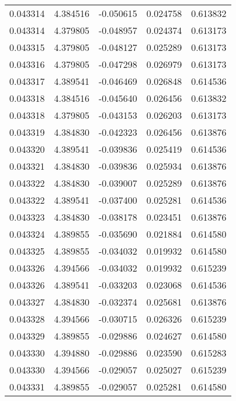\begin{tabular}{lrrrr}
0.043314    &  4.384516 & -0.050615 &  0.024758 &             0.613832 \\
0.043314    &  4.379805 & -0.048957 &  0.024374 &             0.613173 \\
0.043315    &  4.379805 & -0.048127 &  0.025289 &             0.613173 \\
0.043316    &  4.379805 & -0.047298 &  0.026979 &             0.613173 \\
0.043317    &  4.389541 & -0.046469 &  0.026848 &             0.614536 \\
0.043318    &  4.384516 & -0.045640 &  0.026456 &             0.613832 \\
0.043318    &  4.379805 & -0.043153 &  0.026203 &             0.613173 \\
0.043319    &  4.384830 & -0.042323 &  0.026456 &             0.613876 \\
0.043320    &  4.389541 & -0.039836 &  0.025419 &             0.614536 \\
0.043321    &  4.384830 & -0.039836 &  0.025934 &             0.613876 \\
0.043322    &  4.384830 & -0.039007 &  0.025289 &             0.613876 \\
0.043322    &  4.389541 & -0.037400 &  0.025281 &             0.614536 \\
0.043323    &  4.384830 & -0.038178 &  0.023451 &             0.613876 \\
0.043324    &  4.389855 & -0.035690 &  0.021884 &             0.614580 \\
0.043325    &  4.389855 & -0.034032 &  0.019932 &             0.614580 \\
0.043326    &  4.394566 & -0.034032 &  0.019932 &             0.615239 \\
0.043326    &  4.389541 & -0.033203 &  0.023068 &             0.614536 \\
0.043327    &  4.384830 & -0.032374 &  0.025681 &             0.613876 \\
0.043328    &  4.394566 & -0.030715 &  0.026326 &             0.615239 \\
0.043329    &  4.389855 & -0.029886 &  0.024627 &             0.614580 \\
0.043330    &  4.394880 & -0.029886 &  0.023590 &             0.615283 \\
0.043330    &  4.394566 & -0.029057 &  0.025027 &             0.615239 \\
0.043331    &  4.389855 & -0.029057 &  0.025281 &             0.614580 \\

\end{tabular}
